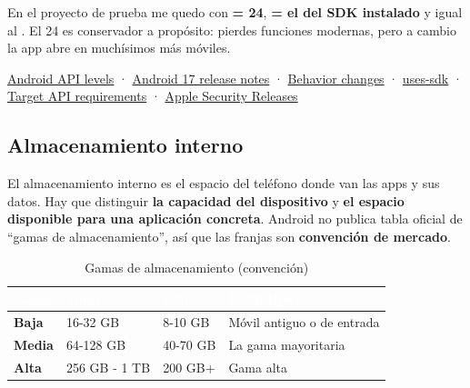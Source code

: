 En el proyecto de prueba me quedo con \textbf{ = 24}, \textbf{ = el del SDK instalado} y \textbf{} igual al . El 24 es conservador a propósito: pierdes funciones modernas, pero a cambio la app abre en muchísimos más móviles.

\begin{fuentesbox}
\href{https://developer.android.com/tools/releases/platforms}{Android API levels} ·
\href{https://developer.android.com/about/versions/17/release-notes}{Android 17 release notes} ·
\href{https://developer.android.com/about/versions/17/behavior-changes-all}{Behavior changes} ·
\href{https://developer.android.com/guide/topics/manifest/uses-sdk-element}{uses-sdk} ·
\href{https://support.google.com/googleplay/android-developer/answer/11926878}{Target API requirements} ·
\href{https://support.apple.com/en-us/148282}{Apple Security Releases}
\end{fuentesbox}

\subsection{Almacenamiento interno}

El almacenamiento interno es el espacio del teléfono donde van las apps y sus datos. Hay que distinguir \textbf{la capacidad del dispositivo} y \textbf{el espacio disponible para una aplicación concreta}. Android no publica tabla oficial de \enquote{gamas de almacenamiento}, así que las franjas son \textbf{convención de mercado}.

\begin{table}[htbp]
\centering
\small
\begin{tabularx}{\textwidth}{@{}l l l >{\RaggedRight\arraybackslash}X@{}}
\toprule
\rowcolor{primary}
\textcolor{white}{\sffamily\bfseries Gama} & \textcolor{white}{\sffamily\bfseries Total} & \textcolor{white}{\sffamily\bfseries Útil} & \textcolor{white}{\sffamily\bfseries Perfil típico} \\
\midrule
\textbf{Baja} & 16-32 GB & 8-10 GB & Móvil antiguo o de entrada \\
\rowcolor{soft}
\textbf{Media} & 64-128 GB & 40-70 GB & La gama mayoritaria \\
\textbf{Alta} & 256 GB - 1 TB & 200 GB+ & Gama alta \\
\bottomrule
\end{tabularx}
\caption{Gamas de almacenamiento (convención)}
\end{table}

